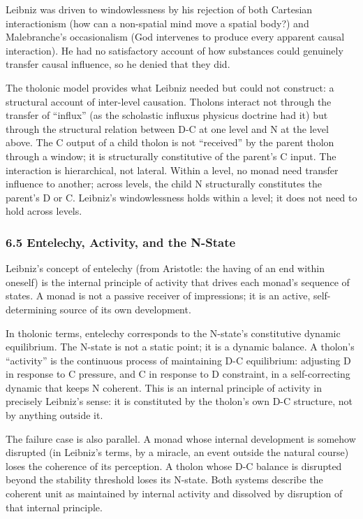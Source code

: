 \documentclass[
  11pt,
  letterpaper,
]{article}
\begin{document}
Leibniz was driven to windowlessness by his rejection of both Cartesian
interactionism (how can a non-spatial mind move a spatial body?) and
Malebranche's occasionalism (God intervenes to produce every apparent
causal interaction). He had no satisfactory account of how substances
could genuinely transfer causal influence, so he denied that they did.

The tholonic model provides what Leibniz needed but could not construct:
a structural account of inter-level causation. Tholons interact not
through the transfer of ``influx'' (as the scholastic influxus physicus
doctrine had it) but through the structural relation between D-C at one
level and N at the level above. The C output of a child tholon is not
``received'' by the parent tholon through a window; it is structurally
constitutive of the parent's C input. The interaction is hierarchical,
not lateral. Within a level, no monad need transfer influence to
another; across levels, the child N structurally constitutes the
parent's D or C. Leibniz's windowlessness holds within a level; it does
not need to hold across levels.

\subsubsection{6.5 Entelechy, Activity, and the
N-State}\label{entelechy-activity-and-the-n-state}

Leibniz's concept of entelechy (from Aristotle: the having of an end
within oneself) is the internal principle of activity that drives each
monad's sequence of states. A monad is not a passive receiver of
impressions; it is an active, self-determining source of its own
development.

In tholonic terms, entelechy corresponds to the N-state's constitutive
dynamic equilibrium. The N-state is not a static point; it is a dynamic
balance. A tholon's ``activity'' is the continuous process of
maintaining D-C equilibrium: adjusting D in response to C pressure, and
C in response to D constraint, in a self-correcting dynamic that keeps N
coherent. This is an internal principle of activity in precisely
Leibniz's sense: it is constituted by the tholon's own D-C structure,
not by anything outside it.

The failure case is also parallel. A monad whose internal development is
somehow disrupted (in Leibniz's terms, by a miracle, an event outside
the natural course) loses the coherence of its perception. A tholon
whose D-C balance is disrupted beyond the stability threshold loses its
N-state. Both systems describe the coherent unit as maintained by
internal activity and dissolved by disruption of that internal
principle.
\end{document}
